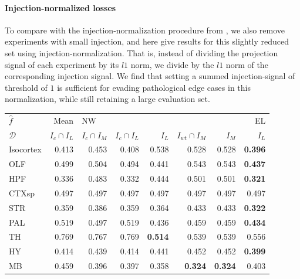 \paragraph{Injection-normalized losses}

To compare with the injection-normalization procedure from \citet{Knox2019-ot}, we also remove experiments with small injection, and here give results for this slightly reduced set using injection-normalization.
That is, instead of dividing the projection signal of each experiment by its $l1$ norm, we divide by the $l1$ norm of the corresponding injection signal.
We find that setting a summed injection-signal of threshold of $1$ is sufficient for evading pathological edge cases in this normalization, while still retaining a large evaluation set.

\begin{table}[H]
\begin{tabular}{lrrrrrrr}
\toprule
$\widehat f$ &           Mean & \multicolumn{5}{l}{NW} &     EL \\
$\mathcal D$ & $I_c \cap I_L$ & $I_c \cap I_M$ & $I_c \cap I_L$ &  $I_L$ & $I_{wt} \cap I_M$ &  $I_M$ &  $I_L$ \\
\midrule
Isocortex &          0.413 &          0.453 &          0.408 &  0.538 &             0.528 &  0.528 &  \textbf{0.396} \\
OLF       &          0.499 &          0.504 &          0.494 &  0.441 &             0.543 &  0.543 &  \textbf{0.437} \\
HPF       &          0.336 &          0.483 &          0.332 &  0.444 &             0.501 &  0.501 & \textbf{ 0.321} \\
CTXsp     &          0.497 &          0.497 &          0.497 &  0.497 &             0.497 &  0.497 &  0.497 \\
STR       &          0.359 &          0.386 &          0.359 &  0.364 &             0.433 &  0.433 &\textbf{  0.322} \\
PAL       &          0.519 &          0.497 &          0.519 &  0.436 &             0.459 &  0.459 &\textbf{  0.434} \\
TH        &          0.769 &          0.767 &          0.769 &  \textbf{0.514} &             0.539 &  0.539 &  0.556 \\
HY        &          0.414 &          0.439 &          0.414 &  0.441 &             0.452 &  0.452 & \textbf{ 0.399} \\
MB        &          0.459 &          0.396 &          0.397 &  0.358 &         \textbf{    0.324 }& \textbf{ 0.324 }&  0.403 \\

\end{tabular}
\end{table}

